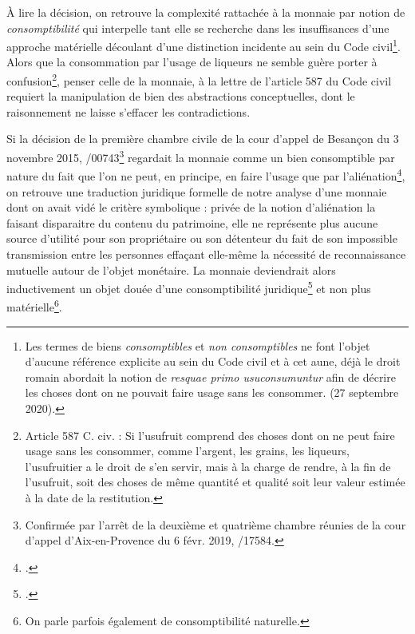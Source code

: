 {À lire la décision, on retrouve la complexité rattachée à la monnaie par notion de \emph{consomptibilité} qui interpelle tant elle se recherche dans les insuffisances d'une approche matérielle découlant d'une distinction incidente au sein du Code civil\footnote{Les termes de biens \emph{consomptibles} et \emph{non consomptibles} ne font l'objet d'aucune référence explicite au sein du Code civil et à cet aune, déjà le droit romain abordait la notion de \emph{resquae primo usuconsumuntur} afin de décrire les choses dont on ne pouvait faire usage sans les consommer.  (27 septembre 2020).}. Alors que la consommation par l'usage de liqueurs ne semble guère porter à confusion\footnote{Article 587 C. civ. : \og Si l'usufruit comprend des choses dont on ne peut faire usage sans les consommer, comme l'argent, les grains, les liqueurs, l'usufruitier a le droit de s'en servir, mais à la charge de rendre, à la fin de l'usufruit, soit des choses de même quantité et qualité soit leur valeur estimée à la date de la restitution\fg{}.}, penser celle de la monnaie, à la lettre de l'article 587 du Code civil requiert la manipulation de bien des abstractions conceptuelles, dont le raisonnement ne laisse s'effacer les contradictions.\par

Si la décision de la première chambre civile de la cour d'appel de Besançon du 3 novembre 2015, /00743\footnote{Confirmée par l'arrêt de la deuxième et quatrième chambre réunies de la cour d'appel d'Aix-en-Provence du 6 févr. 2019, /17584.} regardait la monnaie comme un bien consomptible par nature du fait que l'on ne peut, en principe, en faire l'usage que par l'aliénation\footnote{.}, on retrouve une traduction juridique formelle de notre analyse d'une monnaie dont on avait vidé le critère symbolique : privée de la notion d'aliénation la faisant disparaitre du contenu du patrimoine, elle ne représente plus aucune source d'utilité pour son propriétaire ou son détenteur du fait de son impossible transmission entre les personnes effaçant elle-même la nécessité de reconnaissance mutuelle autour de l'objet monétaire. La monnaie deviendrait alors inductivement un objet douée d'une consomptibilité juridique\footnote{.} et non plus matérielle\footnote{On parle parfois également de consomptibilité naturelle.}.\par

}
